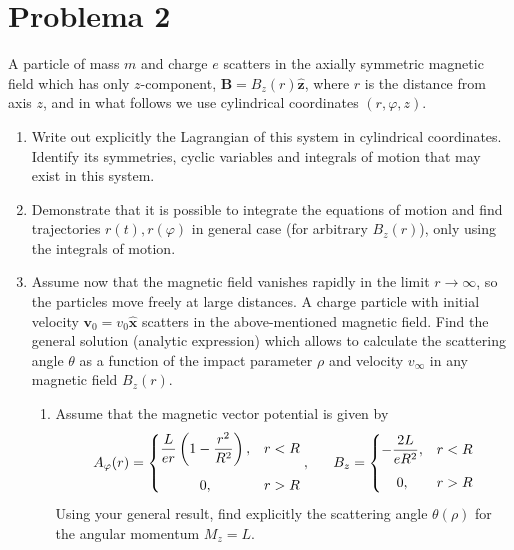 \documentclass[]{article}
\numberwithin{equation}{section}
\newcommand{\0}{\textcolor{gray}{0}}
\newcommand{\xv}{\mathbf{x}}
\newcommand{\zv}{\mathbf{z}}
\newcommand{\xhat}{\hat{\xv}}
\newcommand{\zhat}{\hat{\zv}}
\newcommand{\n}[1]{\mathbf{#1}}
\begin{document}
\section{Problema 2}
A particle of mass \(m\) and charge \(e\) scatters in the axially symmetric magnetic field which has only \(z\)-component, \(\n{B} = B_z (r) \zhat\), where \(r\) is the distance from axis \(z\), and in what follows we use cylindrical coordinates \((r, \varphi, z)\).

\begin{enumerate}
	\item[a)] Write out explicitly the Lagrangian of this system in cylindrical coordinates. Identify its symmetries, cyclic variables and integrals of motion that may exist in this system.
	
	\item [b)] Demonstrate that it is possible to integrate the equations of motion and find trajectories \(r(t), r(\varphi)\) in general case (for arbitrary \(B_z (r)\)), only using the integrals of motion.
	
	\item[c)] Assume now that the magnetic field vanishes rapidly in the limit \(r\rightarrow\infty\), so the particles move freely at large distances. A charge particle with initial velocity \(\n{v}_0 = v_0 \xhat\) scatters in the above-mentioned magnetic field. Find the general solution (analytic expression) which allows to calculate the scattering angle \(\theta\) as a function of the impact parameter \(\rho\) and velocity \(v_\infty\) in any magnetic field \(B_z (r)\).
	\begin{enumerate}
		\item[i.] Assume that the magnetic vector potential is given by
		\begin{equation*}
			A_\varphi(r) = \left\lbrace \begin{matrix}
				\dfrac{L}{e r}\left(1 - \dfrac{r^2}{R^2}\right), & r < R \vspace{3mm}\\
				0, & r > R
			\end{matrix}\right. , ~~~~~ B_z = \left\lbrace \begin{matrix}
			-\dfrac{2 L}{e R^2}, & r < R \vspace{3mm}\\
			0, & r > R
			\end{matrix}\right.
		\end{equation*}
		Using your general result, find explicitly the scattering angle \(\theta(\rho)\) for the angular momentum \(M_z = L\).
	\end{enumerate}
\end{enumerate}
\end{document}
